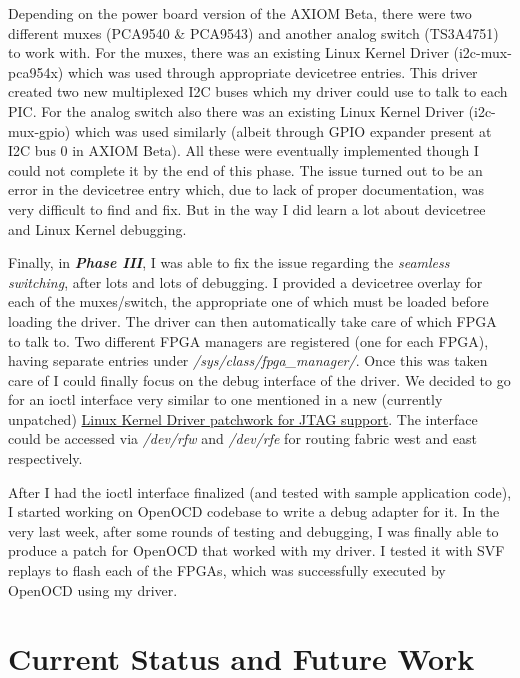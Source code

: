 \documentclass{article}
\begin{document}
Depending on the power board version of the AXIOM Beta, there were two different
muxes (PCA9540 \& PCA9543) and another analog switch (TS3A4751) to work with. 
For the muxes, there was an existing Linux Kernel Driver (i2c-mux-pca954x) which
was used through appropriate devicetree entries. This driver created two new
multiplexed I2C buses which my driver could use to talk to each PIC. For the
analog switch also there was an existing Linux Kernel Driver (i2c-mux-gpio) which
was used similarly (albeit through GPIO expander present at I2C bus 0 in AXIOM
Beta). All these were eventually implemented though I could not complete it by
the end of this phase. The issue turned out to be an error in the devicetree
entry which, due to lack of proper documentation, was very difficult to find and fix.
But in the way I did learn a lot about devicetree and Linux Kernel debugging.\newline

Finally, in \emph{\textbf{Phase III}}, I was able to fix the issue regarding the
\emph{seamless switching},
after lots and lots of debugging. I provided a devicetree overlay
for each of the muxes/switch, the appropriate one of which must be loaded before
loading the driver. The driver can then automatically take care of which
FPGA to talk to. Two different FPGA managers are registered (one for each FPGA),
having separate entries under \emph{/sys/class/fpga\_manager/}. Once this
was taken care of I could finally focus on the debug interface of the driver.
We decided to go for an ioctl interface very similar to one mentioned in a
new (currently unpatched)
\href{https://lore.kernel.org/patchwork/cover/1223367/}{Linux Kernel Driver patchwork for JTAG support}.
The interface could be accessed via \emph{/dev/rfw} and \emph{/dev/rfe} for
routing fabric west and east respectively.\newline

After I had the ioctl interface finalized (and tested with sample application code),
I started working on OpenOCD codebase to write a debug adapter for it.
In the very last week, after some rounds of testing and debugging,
I was finally able to produce a patch for OpenOCD that worked with my driver.
I tested it with SVF replays to flash each of the FPGAs, which was successfully
executed by OpenOCD using my driver.\newline

\section{Current Status and Future Work}
\end{document}
